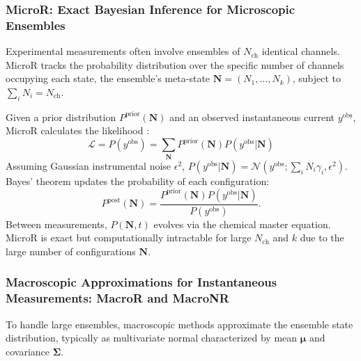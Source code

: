 \documentclass[pdflatex,sn-nature]{sn-jnl}%
\begin{document}
\subsubsection{MicroR: Exact Bayesian Inference for Microscopic Ensembles}
\label{sec:micror}
Experimental measurements often involve ensembles of \(N_{\text{ch}}\) identical channels. MicroR tracks the probability distribution over the specific number of channels occupying each state, the ensemble's meta-state \( \boldsymbol{N} = (N_1, \dots, N_k) \), subject to \( \sum_i N_i = N_{\text{ch}} \).

Given a prior distribution \( P^{\text{prior}}(\boldsymbol{N}) \) and an observed instantaneous current \(y^{\text{obs}}\), MicroR calculates the likelihood \cite{Moffatt}:
\begin{equation}
    \mathcal{L} = P(y^{\text{obs}}) = \sum_{\boldsymbol{N}} P^{\text{prior}}(\boldsymbol{N}) P(y^{\text{obs}} | \boldsymbol{N})
    \label{eq:microR_likelihood}
\end{equation}
Assuming Gaussian instrumental noise \(\epsilon^2\), \( P(y^{\text{obs}} | \boldsymbol{N}) = \mathcal{N}(y^{\text{obs}}; \sum_i N_i \gamma_i, \epsilon^2) \). Bayes' theorem updates the probability of each configuration:
\begin{equation}
    P^{\text{post}}(\boldsymbol{N}) = \frac{ P^{\text{prior}}(\boldsymbol{N}) P(y^{\text{obs}} | \boldsymbol{N})}{P(y^{\text{obs}})}.
    \label{eq:microR_posterior}
\end{equation}
Between measurements, \( P(\boldsymbol{N}, t) \) evolves via the chemical master equation. MicroR is exact but computationally intractable for large \(N_{\text{ch}}\) and \(k\) due to the large number of configurations \(\boldsymbol{N}\).

\subsubsection{Macroscopic Approximations for Instantaneous Measurements: MacroR and MacroNR}
\label{sec:macroscopic_instantaneous}
To handle large ensembles, macroscopic methods approximate the ensemble state distribution, typically as multivariate normal characterized by mean \(\boldsymbol{\mu}\) and covariance \(\boldsymbol{\Sigma}\).
\end{document}
